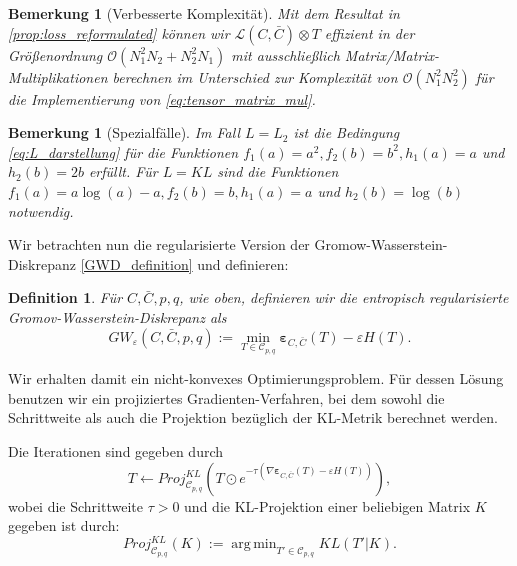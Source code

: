 \documentclass[twoside, 11pt,a4paper]{article}
\DeclareMathOperator*{\argmin}{arg\,min}
\newtheorem{definition}[theorem]{Definition}
\newtheorem{remark}[theorem]{Bemerkung}
\numberwithin{equation}{section}
\begin{document}
	\begin{remark}[Verbesserte Komplexität]
		Mit dem Resultat in \autoref{prop:loss_reformulated} können wir $\mathcal{L} (C,\bar{C}) \otimes T$ effizient in der Größenordnung $\mathcal{O}(N_1^2N_2 + N_2^2N_1)$ mit ausschließlich Matrix/Matrix-Multiplikationen berechnen im Unterschied zur Komplexität von $\mathcal{O}(N_1^2N_2^2)$ für die Implementierung von \autoref{eq:tensor_matrix_mul}.
	\end{remark}
	
	\begin{remark}[Spezialfälle]
		Im Fall $L=L_2$ ist die Bedingung \autoref{eq:L_darstellung} für die Funktionen $f_1(a) = a^2, f_2(b) = b^2, h_1(a) = a$ und $h_2(b) = 2b$ erfüllt.
		Für $L=KL$ sind die Funktionen $f_1(a) = a \log (a) -a, f_2(b) = b, h_1(a) =a $ und $h_2(b) = \log (b)$ notwendig.
	\end{remark}
	
	Wir betrachten nun die regularisierte Version der Gromow-Wasserstein-Diskrepanz \ref{GWD_definition} und definieren:
	
	\begin{definition}
		Für $C, \bar{C}, p, q$, wie oben, definieren wir die entropisch regularisierte Gromov-Wasserstein-Diskrepanz als 
		\begin{equation}
		GW_{\varepsilon}(C,\bar{C}, p, q):=\min_{T \in \mathcal{C}_{p, q}} \boldsymbol{\varepsilon}_{C, \bar{C}}(T) -\varepsilon H(T).
		\end{equation}
	\end{definition}
	
	Wir erhalten damit ein nicht-konvexes Optimierungsproblem. Für dessen Lösung benutzen wir ein projiziertes Gradienten-Verfahren, bei dem sowohl die Schrittweite als auch die Projektion bezüglich der KL-Metrik berechnet werden.
	
	Die Iterationen sind gegeben durch
	\begin{equation}
	T \leftarrow Proj_{\mathcal{C}_{p,q}}^{KL} \left(T \odot e^{-\tau( \nabla \boldsymbol{\varepsilon}_{C, \bar{C}}(T) -\varepsilon H(T))} \right), \label{iteration_projection}
	\end{equation}
	wobei die Schrittweite $\tau > 0$ und die KL-Projektion einer beliebigen Matrix $K$ gegeben ist durch:
	\begin{equation}
	Proj_{\mathcal{C}_{p,q}}^{KL}(K) := \argmin_{T' \in \mathcal{C}_{p,q}} KL(T'|K).
	\end{equation}
	
\end{document}

